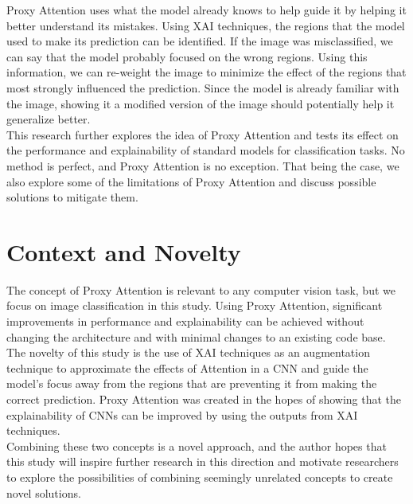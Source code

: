 \documentclass[a4paper,11pt,openright]{book}
\begin{document}
Proxy Attention uses what the model already knows to help guide it by helping it better understand its mistakes. Using XAI techniques, the regions that the model used to make its prediction can be identified. If the image was misclassified, we can say that the model probably focused on the wrong regions. Using this information, we can re-weight the image to minimize the effect of the regions that most strongly influenced the prediction. Since the model is already familiar with the image, showing it a modified version of the image should potentially help it generalize better.\\
This research further explores the idea of Proxy Attention and tests its effect on the performance and explainability of standard models for classification tasks. No method is perfect, and Proxy Attention is no exception. That being the case, we also explore some of the limitations of Proxy Attention and discuss possible solutions to mitigate them.

\section{Context and Novelty}
The concept of Proxy Attention is relevant to any computer vision task, but we focus on image classification in this study. Using Proxy Attention, significant improvements in performance and explainability can be achieved without changing the architecture and with minimal changes to an existing code base.\\
The novelty of this study is the use of XAI techniques as an augmentation technique to approximate the effects of Attention in a CNN and guide the model's focus away from the regions that are preventing it from making the correct prediction. Proxy Attention was created in the hopes of showing that the explainability of CNNs can be improved by using the outputs from XAI techniques.\\
Combining these two concepts is a novel approach, and the author hopes that this study will inspire further research in this direction and motivate researchers to explore the possibilities of combining seemingly unrelated concepts to create novel solutions.
\end{document}
